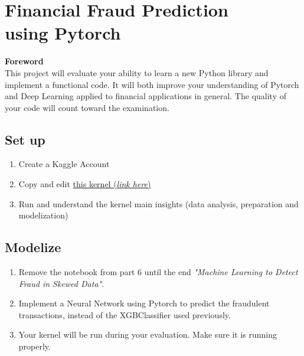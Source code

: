 
\setcounter{section}{4}



\section{Financial Fraud Prediction\\using Pytorch}

\textbf{Foreword}\\

This project will evaluate your ability to learn a new Python library and implement a functional code. It will both improve your understanding of Pytorch and Deep Learning applied to financial applications in general. The quality of your code will count toward the examination.

\subsection{Set up}

\begin{enumerate}
    \item Create a Kaggle Account
    \item Copy and edit \href{https://www.kaggle.com/arjunjoshua/predicting-fraud-in-financial-payment-services}{this kernel (\textit{link here})}
    \item Run and understand the kernel main insights (data analysis, preparation and modelization)
\end{enumerate}

\subsection{Modelize}

\begin{enumerate}
    \item Remove the notebook from part 6 until the end \textit{"Machine Learning to Detect Fraud in Skewed Data"}.
    \item Implement a Neural Network using Pytorch to predict the fraudulent transactions, instead of the XGBClassifier used previously.
    \item Your kernel will be run during your evaluation. Make sure it is running properly.
\end{enumerate}



